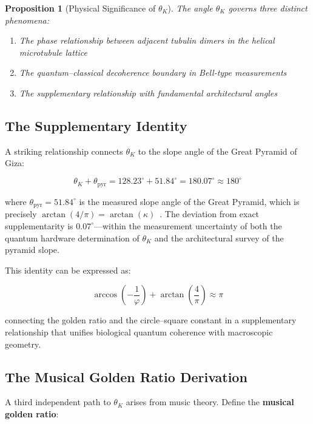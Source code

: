 \documentclass[12pt,a4paper]{article}
\theoremstyle{plain}
\newtheorem{proposition}[theorem]{Proposition}
\theoremstyle{definition}
\newcommand{\thetaK}{\theta_K}
\newcommand{\golden}{\varphi}
\newcommand{\kap}{\kappa}
\begin{document}
\begin{proposition}[Physical Significance of $\thetaK$]
The angle $\thetaK$ governs three distinct phenomena:
\begin{enumerate}
    \item The phase relationship between adjacent tubulin dimers in the helical microtubule lattice
    \item The quantum--classical decoherence boundary in Bell-type measurements
    \item The supplementary relationship with fundamental architectural angles
\end{enumerate}
\end{proposition}

\subsection{The Supplementary Identity}

A striking relationship connects $\thetaK$ to the slope angle of the Great Pyramid of Giza:

\begin{equation}
\label{eq:supplementary}
\thetaK + \theta_{\mathrm{pyr}} = 128.23^\circ + 51.84^\circ = 180.07^\circ \approx 180^\circ
\end{equation}

\noindent where $\theta_{\mathrm{pyr}} = 51.84^\circ$ is the measured slope angle of the Great Pyramid, which is precisely $\arctan(4/\pi) = \arctan(\kap)$~\cite{petrie1883}. The deviation from exact supplementarity is $0.07^\circ$---within the measurement uncertainty of both the quantum hardware determination of $\thetaK$ and the architectural survey of the pyramid slope.

This identity can be expressed as:

\begin{equation}
\arccos\!\left(-\frac{1}{\golden}\right) + \arctan\!\left(\frac{4}{\pi}\right) \approx \pi
\end{equation}

\noindent connecting the golden ratio and the circle--square constant in a supplementary relationship that unifies biological quantum coherence with macroscopic geometry.

\subsection{The Musical Golden Ratio Derivation}

A third independent path to $\thetaK$ arises from music theory. Define the \textbf{musical golden ratio}:
\end{document}
